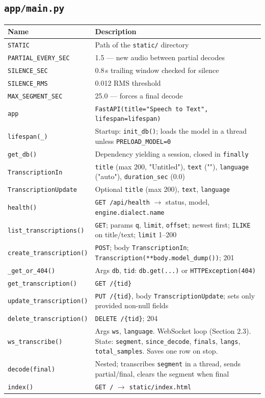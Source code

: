 \documentclass[11pt,a4paper]{article}
\begin{document}
\subsection{\texttt{app/main.py}}
\begin{longtable}{@{}p{4.6cm}p{10.6cm}@{}}
\toprule
\textbf{Name} & \textbf{Description}\\
\midrule
\endhead
\texttt{STATIC} & Path of the \texttt{static/} directory\\
\texttt{PARTIAL\_EVERY\_SEC} & 1.5 --- new audio between partial decodes\\
\texttt{SILENCE\_SEC} & 0.8\,s trailing window checked for silence\\
\texttt{SILENCE\_RMS} & 0.012 RMS threshold\\
\texttt{MAX\_SEGMENT\_SEC} & 25.0 --- forces a final decode\\
\texttt{app} & \texttt{FastAPI(title="Speech to Text", lifespan=lifespan)}\\
\texttt{lifespan(\_)} & Startup: \texttt{init\_db()}; loads the model in a thread unless \texttt{PRELOAD\_MODEL=0}\\
\texttt{get\_db()} & Dependency yielding a session, closed in \texttt{finally}\\
\texttt{TranscriptionIn} & \texttt{title} (max 200, "Untitled"), \texttt{text} (""), \texttt{language} ("auto"), \texttt{duration\_sec} (0.0)\\
\texttt{TranscriptionUpdate} & Optional \texttt{title} (max 200), \texttt{text}, \texttt{language}\\
\texttt{health()} & \texttt{GET /api/health} $\to$ status, model, \texttt{engine.dialect.name}\\
\texttt{list\_transcriptions()} & \texttt{GET}; params \texttt{q}, \texttt{limit}, \texttt{offset}; newest first; \texttt{ILIKE} on title/text; \texttt{limit} 1--200\\
\texttt{create\_transcription()} & \texttt{POST}; body \texttt{TranscriptionIn}; \texttt{Transcription(**body.model\_dump())}; 201\\
\texttt{\_get\_or\_404()} & Args \texttt{db}, \texttt{tid}: \texttt{db.get(...)} or \texttt{HTTPException(404)}\\
\texttt{get\_transcription()} & \texttt{GET /\{tid\}}\\
\texttt{update\_transcription()} & \texttt{PUT /\{tid\}}, body \texttt{TranscriptionUpdate}; sets only provided non-null fields\\
\texttt{delete\_transcription()} & \texttt{DELETE /\{tid\}}; 204\\
\texttt{ws\_transcribe()} & Args \texttt{ws}, \texttt{language}. WebSocket loop (Section 2.3). State: \texttt{segment}, \texttt{since\_decode}, \texttt{finals}, \texttt{langs}, \texttt{total\_samples}. Saves one row on stop.\\
\quad\texttt{decode(final)} & Nested; transcribes \texttt{segment} in a thread, sends partial/final, clears the segment when final\\
\texttt{index()} & \texttt{GET /} $\to$ \texttt{static/index.html}\\
\bottomrule
\end{longtable}
\end{document}
